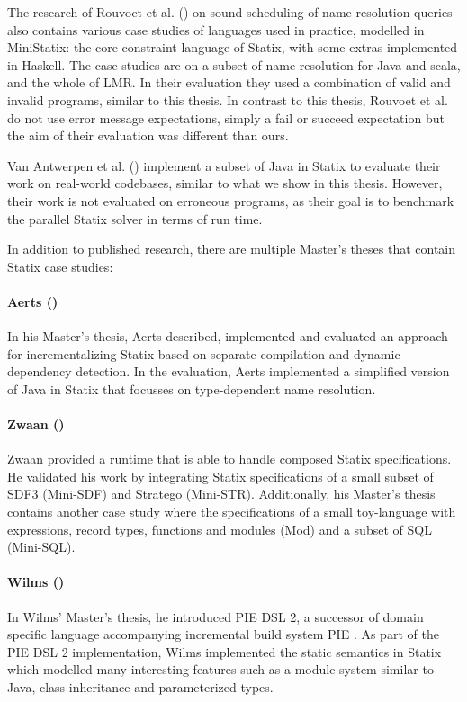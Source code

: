       The research of Rouvoet et al. (\citeyear{RouvoetAPKV20}) on sound scheduling of name resolution queries also contains various case studies of languages used in practice, modelled in MiniStatix: the core constraint language of Statix, with some extras implemented in Haskell. The case studies are on a subset of name resolution for Java and scala, and the whole of LMR. In their evaluation they used a combination of valid and invalid programs, similar to this thesis. In contrast to this thesis, Rouvoet et al. do not use error message expectations, simply a fail or succeed expectation but the aim of their evaluation was different than ours. 

      Van Antwerpen et al. (\citeyear{AntwerpenV21}) implement a subset of Java in Statix to evaluate their work on real-world codebases, similar to what we show in this thesis. However, their work is not evaluated on erroneous programs, as their goal is to benchmark the parallel Statix solver in terms of run time.

      In addition to published research, there are multiple Master's theses that contain Statix case studies:

      \paragraph{Aerts (\citeyear{Aerts2019})} In his Master's thesis, Aerts described, implemented and evaluated an approach for incrementalizing Statix based on separate compilation and dynamic dependency detection. In the evaluation, Aerts implemented a simplified version of Java in Statix that focusses on type-dependent name resolution.

      \paragraph{Zwaan (\citeyear{Zwaan2021})} Zwaan provided a runtime that is able to handle composed Statix specifications. He validated his work by integrating Statix specifications of a small subset of SDF3 (Mini-SDF) and Stratego (Mini-STR). Additionally, his Master's thesis contains another case study where the specifications of a small toy-language with expressions, record types, functions and modules (Mod) and a subset of SQL (Mini-SQL).

      \paragraph{Wilms (\citeyear{Wilms2022})} In Wilms' Master's thesis, he introduced PIE DSL 2, a successor of domain specific language accompanying incremental build system PIE \autocite{KonatSEV19}. As part of the PIE DSL 2 implementation, Wilms implemented the static semantics in Statix which modelled many interesting features such as a module system similar to Java, class inheritance and parameterized types.

